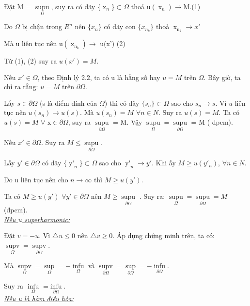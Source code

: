 Đặt M = $\mathop {\sup u}\limits_\Omega$, suy ra có dãy $\lbrace\mathop x\nolimits_n\rbrace\subset\Omega$
thoả u$\left(\mathop x\nolimits_n\right)\rightarrow$M.(1)

Do $\Omega$ bị chận trong $R^n$ nên $\lbrace x_n \rbrace$ có dãy con $\lbrace x_{n_k}\rbrace$ thoả $\mathop x\nolimits_{\mathop n\nolimits_k } \rightarrow x'$

Mà u liên tục nên u$\left(\mathop x\nolimits_{\mathop n\nolimits_k }
\right)\rightarrow$ u(x') (2)

Từ (1), (2) suy ra $u(x')=M$.

Nếu $x'\in\Omega$, theo Định lý 2.2, ta có u là hằng số hay $u = M$ trên $\Omega$. Bây giờ, ta chỉ ra rằng: $u=M$ trên $\partial\Omega$.

Lấy $s \in\partial \Omega$ (s là điểm dính của $\Omega$) thì có dãy $\lbrace s_n \rbrace \subset\Omega$ sao cho $s_{n}\rightarrow s$. Vì $u$ liên tục nên $u(s_n) \rightarrow u(s)$. Mà $u(s_n) = M$ $\forall n \in N$. Suy ra $u(s) = M$. Ta có $u(s) = M$ $\forall$ x$\in\partial\Omega$, suy ra  $\mathop {\sup u}\limits_{\partial \Omega }$ = M. Vậy  $\mathop {\sup u}\limits_\Omega   = \mathop {\sup u}\limits_{\partial \Omega }$ = M ( đpcm).

Nếu $x'\in\partial\Omega$. Suy ra $M \leq\mathop {\sup u}\limits_{\partial \Omega }$.

Lấy $y' \in\partial\Omega$ có dãy $\lbrace\mathop {y'}\nolimits_n \rbrace\subset\Omega$ sao cho $\mathop {y'}\nolimits_n\rightarrow y'$. Khi ấy $M \geq u(y'_n)$, $\forall n \in N$.

Do u liên tục nên cho $n \rightarrow \infty$ thì $M \geq u(y')$.

Ta có $M \geq u(y')$ $\forall y' \in\partial\Omega$ nên $M \geq \mathop{\sup u}\limits_{\partial \Omega }$ . Suy ra: $\mathop {\sup u}\limits_\Omega   = \mathop {\sup u}\limits_{\partial \Omega } = M$ (đpcm).
\\
\underline{\textit{Nếu $u$ superharmonic:}}

Đặt $v = -u$. Vì $\bigtriangleup u \leq 0$ nên $\bigtriangleup v \geq 0$. Áp dụng chứng minh trên, ta có:  $\mathop {\sup v}\limits_\Omega   = \mathop {\sup v}\limits_{\partial \Omega }$.

 Mà  $\mathop {\sup v}\limits_\Omega = \mathop {\sup (-u)}\limits_\Omega  = -\mathop {\inf u}\limits_\Omega $ và $\mathop {\sup v}\limits_{\partial \Omega }
=\mathop {\sup (-u)}\limits_{\partial \Omega } 
=-\mathop {\inf u}\limits_{\partial \Omega } $.

Suy ra $\mathop {\inf u}\limits_\Omega $ =$\mathop {\inf u}\limits_{\partial \Omega } $.
\\
\underline{\textit{Nếu u là hàm điều hòa:}}

